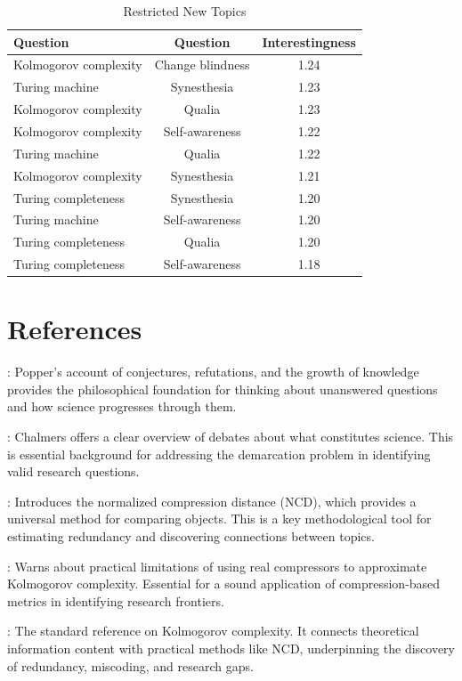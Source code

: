 \begin{table}
\begin{centering}
\begin{tabular}{|l|c|c|}
\hline 
{Question} & Question & Interestingness\tabularnewline
\hline 
\hline 
Kolmogorov complexity & Change blindness & 1.24\tabularnewline
\hline 
{Turing machine} & Synesthesia & 1.23\tabularnewline
\hline 
Kolmogorov complexity & Qualia & 1.23\tabularnewline
\hline 
Kolmogorov complexity & Self-awareness & 1.22\tabularnewline
\hline 
Turing machine & Qualia & 1.22\tabularnewline
\hline 
Kolmogorov complexity & Synesthesia & 1.21\tabularnewline
\hline 
Turing completeness & Synesthesia & 1.20\tabularnewline
\hline 
Turing machine & Self-awareness & 1.20\tabularnewline
\hline 
Turing completeness & Qualia & 1.20\tabularnewline
\hline 
Turing completeness & Self-awareness & 1.18\tabularnewline
\hline 
\end{tabular}
\par\end{centering}

\caption{\label{tab:Restricted-Serendipity}Restricted New Topics}
\end{table}

\section*{References}

\cite{popper2014conjectures}: Popper's account of conjectures, refutations, and the growth of knowledge provides the philosophical foundation for thinking about unanswered questions and how science progresses through them.

\cite{chalmers2013thing}: Chalmers offers a clear overview of debates about what constitutes science. This is essential background for addressing the demarcation problem in identifying valid research questions.

\cite{li2004similarity}: Introduces the normalized compression distance (NCD), which provides a universal method for comparing objects. This is a key methodological tool for estimating redundancy and discovering connections between topics.

\cite{cebrian2005common}: Warns about practical limitations of using real compressors to approximate Kolmogorov complexity. Essential for a sound application of compression-based metrics in identifying research frontiers.

\cite{li2013introduction}: The standard reference on Kolmogorov complexity. It connects theoretical information content with practical methods like NCD, underpinning the discovery of redundancy, miscoding, and research gaps.


